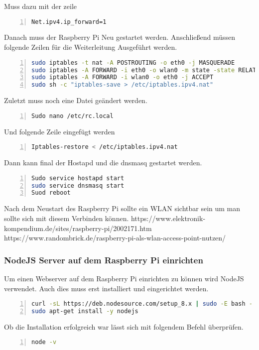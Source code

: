 Muss dazu mit der zeile
\begin{lstlisting}[caption={Konfiguration IPV4}, language={bash}, numbers=left]
Net.ipv4.ip_forward=1
\end{lstlisting}
Danach muss der Raspberry Pi Neu gestartet werden.
Anschließend müssen folgende Zeilen für die Weiterleitung Ausgeführt werden.
\begin{lstlisting}[caption={Konfiguration IPV4}, language={bash}, numbers=left]
sudo iptables -t nat -A POSTROUTING -o eth0 -j MASQUERADE
sudo iptables -A FORWARD -i eth0 -o wlan0 -m state -state RELATED,ESTABLISHED -j ACCEPT
sudo iptables -A FORWARD -i wlan0 -o eth0 -j ACCEPT
sudo sh -c "iptables-save > /etc/iptables.ipv4.nat"
\end{lstlisting}
Zuletzt muss noch eine Datei geändert werden.
\begin{lstlisting}[caption={Konfiguration IPV4}, language={bash}, numbers=left]
Sudo nano /etc/rc.local
\end{lstlisting}
Und folgende Zeile eingefügt werden
\begin{lstlisting}[caption={Konfiguration IPV4}, language={bash}, numbers=left]
Iptables-restore < /etc/iptables.ipv4.nat
\end{lstlisting}
Dann kann final der Hostapd und die dnsmasq gestartet werden.
\begin{lstlisting}[caption={Starten der neu installierten Packages}, language={bash}, numbers=left]
Sudo service hostapd start
sudo service dnsmasq start
Suod reboot
\end{lstlisting}
Nach dem Neustart des Raspberry Pi sollte ein \ac{WLAN} sichtbar sein um man sollte sich mit diesem Verbinden können. https://www.elektronik-kompendium.de/sites/raspberry-pi/2002171.htm https://www.randombrick.de/raspberry-pi-als-wlan-access-point-nutzen/ 


\subsubsection{NodeJS Server auf dem Raspberry Pi einrichten}
Um einen Webserver auf dem Raspberry Pi einrichten zu können wird NodeJS verwendet. Auch dies muss erst installiert und eingerichtet werden. 
\begin{lstlisting}[caption={Installation NodeJS}, language={bash}, numbers=left]
curl -sL https://deb.nodesource.com/setup_8.x | sudo -E bash -
sudo apt-get install -y nodejs
\end{lstlisting}
Ob die Installation erfolgreich war lässt sich mit folgendem Befehl überprüfen.
\begin{lstlisting}[caption={Installation NodeJS}, language={bash}, numbers=left]
node -v
\end{lstlisting}

